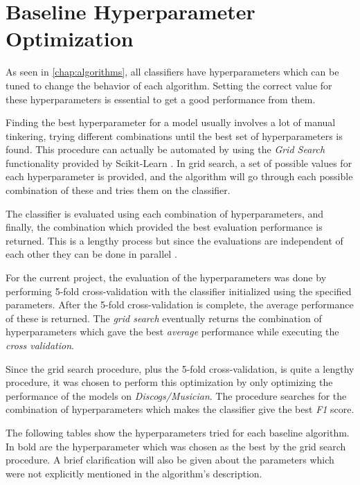 \documentclass[epsfig,a4paper,11pt,titlepage,twoside,openany]{book}
\begin{document}
\section{Baseline Hyperparameter Optimization}
\label{sec:hyperpar-optimization}

As seen in \autoref{chap:algorithms}, all classifiers have hyperparameters which can be tuned to change the behavior of each algorithm. Setting the correct value for these hyperparameters is essential to get a good performance from them. 

Finding the best hyperparameter for a model usually involves a lot of manual tinkering, trying different combinations until the best set of hyperparameters is found. This procedure can actually be automated by using the \textit{Grid Search} \cite{claesen2015hyperparameter} functionality provided by Scikit-Learn \cite{scikit-learn}. In grid search, a set of possible values for each hyperparameter is provided, and the algorithm will go through each possible combination of these and tries them on the classifier. 

The classifier is evaluated using each combination of hyperparameters, and finally, the combination which provided the best evaluation performance is returned. This is a lengthy process but since the evaluations are independent of each other they can be done in parallel \cite{Bergstra:2012_random_gs}.

For the current project, the evaluation of the hyperparameters was done by performing 5-fold cross-validation with the classifier initialized using the specified parameters. After the 5-fold cross-validation is complete, the average performance of these is returned. The \textit{grid search} eventually returns the combination of hyperparameters which gave the best \textit{average} performance while executing the \textit{cross validation}.

Since the grid search procedure, plus the 5-fold cross-validation, is quite a lengthy procedure, it was chosen to perform this optimization by only optimizing the performance of the models on \textit{Discogs/Musician}. The procedure searches for the combination of hyperparameters which makes the classifier give the best \textit{F1} score.

The following tables show the hyperparameters tried for each baseline algorithm. In bold are the hyperparameter which was chosen as the best by the grid search procedure. A brief clarification will also be given about the parameters which were not explicitly mentioned in the algorithm's description. 
\end{document}
